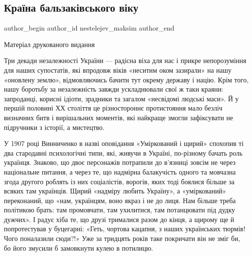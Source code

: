  
 
 
 
 
\subsection{Країна бальзаківського віку}
\label{sec:11_09_2021.stz.news.ua.tyzhden.1.kraina_balzak_vozrast}


\ifcmt
 author_begin
   author_id nestelejev_maksim
 author_end
\fi

Матеріал друкованого видання 


Три декади незалежності України — радісна віха для нас і прикре непорозуміння
для наших супостатів, які впродовж віків «неситим оком зазирали» на нашу
«оновлену землю», відмовляючись бачити тут окрему державу і націю. Крім того,
нашу боротьбу за незалежність завжди ускладнювали свої ж таки краяни:
запроданці, корисні ідіоти, зрадники та загалом «несвідомі людські маси». Й у
першій половині ХХ століття це різностороннє протистояння мало безліч визначних
битв і вирішальних моментів, які найкраще змогли зафіксувати не підручники з
історії, а мистецтво.

У 1907 році Винниченко в назві оповідання «Уміркований і щирий» спохопив ті два
стародавні психологічні типи, які, живучи в Україні, по-різному бачать роль
українця. Знаково, що двоє персонажів потрапили до в’язниці зовсім не через
національне питання, а через те, що надмірна балакучість одного та мовчазна
згода другого роблять із них соціалістів, ворогів, яких тоді боялися більше за
всяких там українців. Щирий «надміру любить Україну», а «уміркований»
переконаний, що «нам, українцям, воно якраз і не до лиця. Нам більше треба
політикою брать: там промовчати, там ухилитися, там потанцювати під дудку
дужчих». І радує хіба те, що друзі трималися разом до кінця, а щирому ще й
попротестував у буцегарні: «Геть, чортова кацапня, з наших українських тюрмів!
Чого поналазили сюди?!» Уже за тридцять років таке покричати він не зміг би, бо
його змусили б замовкнути кулею в потилицю.

